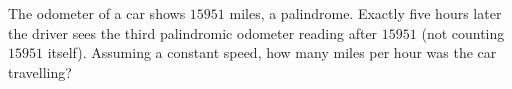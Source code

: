 The odometer of a car shows $15951$ miles, a palindrome. Exactly five hours later the driver sees the third palindromic odometer reading after $15951$ (not counting $15951$ itself). Assuming a constant speed, how many miles per hour was the car travelling?
